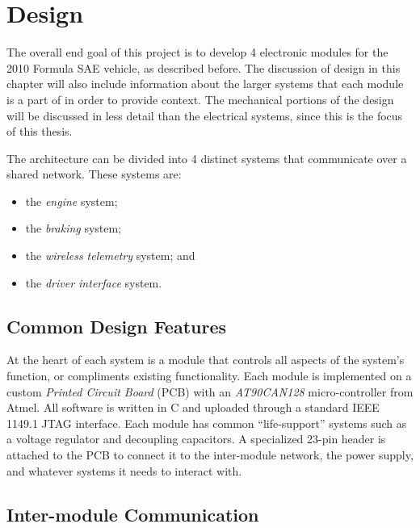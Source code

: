 %
%
%
%

\chapter{Design}
\label{ch:design}

The overall end goal of this project is to develop 4 electronic modules for the 2010 Formula SAE vehicle, as described before. The discussion of design in this chapter will also include information about the larger systems that each module is a part of in order to provide context. The mechanical portions of the design will be discussed in less detail than the electrical systems, since this is the focus of this thesis.

The architecture can be divided into 4 distinct systems that communicate over a shared network. These systems are:

\begin{itemize}
\item the \emph{engine} system;
\item the \emph{braking} system;
\item the \emph{wireless telemetry} system; and
\item the \emph{driver interface} system.
\end{itemize}

\section{Common Design Features}
\label{sec:common_design_features}


At the heart of each system is a module that controls all aspects of the system's function, or compliments existing functionality. Each module is implemented on a custom \emph{Printed Circuit Board} (PCB) with an \emph{AT90CAN128} micro-controller from Atmel. All software is written in C and uploaded through a standard IEEE 1149.1 JTAG interface. Each module has common {}``life-support'' systems such as a voltage regulator and decoupling capacitors. A specialized 23-pin header is attached to the PCB to connect it to the inter-module network, the power supply, and whatever systems it needs to interact with.

\section{Inter-module Communication}
\label{sec:inter_module_communication}

